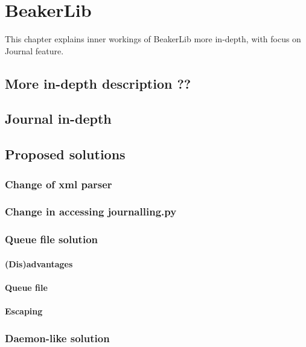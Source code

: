\chapter{BeakerLib}
This chapter explains inner workings of BeakerLib more in-depth, with focus on Journal feature.

\section{More in-depth description ?? }

\section{Journal in-depth}

\section{Proposed solutions}

\subsection{Change of xml parser}

\subsection{Change in accessing journalling.py}

\subsection{Queue file solution}

\subsubsection{(Dis)advantages}

\subsubsection{Queue file}

\subsubsection{Escaping}


\subsection{Daemon-like solution}

